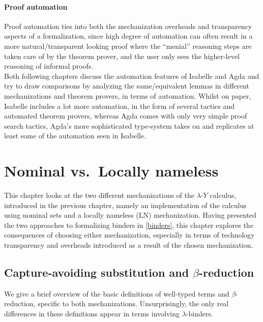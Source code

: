 \documentclass[a4paper, 12pt, twoside]{style/ociamthesis}
\theoremstyle{plain}
\theoremstyle{definition}
\theoremstyle{remark}
\newcommand{\lamy}{\lambda\text{-}Y}
\begin{document}
\subsubsection{Proof automation}\label{proof-automation}

Proof automation ties into both the mechanization overheads and
transparency aspects of a formalization, since high degree of automation
can often result in a more natural/transparent looking proof where the
``menial'' reasoning steps are taken care of by the theorem prover, and
the user only sees the higher-level reasoning of informal proofs.\\
Both following chapters discuss the automation features of Isabelle and
Agda and try to draw comparisons by analyzing the same/equivalent lemmas
in different mechanizations and theorem provers, in terms of automation.
Whilst on paper, Isabelle includes a lot more automation, in the form of
several tactics and automated theorem provers, whereas Agda comes with
only very simple proof search tactics, Agda's more sophisticated
type-system takes on and replicates at least some of the automation seen
in Isabelle.

\chapter{Nominal vs.~Locally nameless}\label{comp-isa}

\label{chap:compIsa}

This chapter looks at the two different mechanizations of the \(\lamy\)
calculus, introduced in the previous chapter, namely an implementation
of the calculus using nominal sets and a locally nameless (LN)
mechanization. Having presented the two approaches to formalizing
binders in \cref{binders}, this chapter explores the consequences of
choosing either mechanization, especially in terms of technology
transparency and overheads introduced as a result of the chosen
mechanization.

\section{\texorpdfstring{Capture-avoiding substitution and
\(\beta\)-reduction}{Capture-avoiding substitution and \textbackslash{}beta-reduction}}\label{capture-avoiding-substitution-and-beta-reduction}

We give a brief overview of the basic definitions of well-typed terms
and \(\beta\)-reduction, specific to both mechanizations.
Unsurprisingly, the only real differences in these definitions appear in
terms involving \(\lambda\)-binders.
\end{document}
